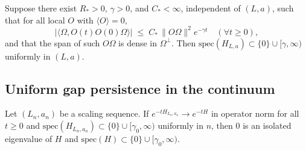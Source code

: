 \documentclass[11pt]{amsart}
\begin{document}
\begin{proposition}\label{prop:cluster-to-gap}
Suppose there exist $R_*>0$, $\gamma>0$, and $C_*<\infty$, independent of $(L,a)$, such that for all local $O$ with $\langle O\rangle=0$,
\[
  |\langle\Omega, O(t)O(0)\Omega\rangle|\;\le\; C_*\,\|O\Omega\|^2 e^{-\gamma t}\quad(\forall t\ge 0),
\]
and that the span of such $O\Omega$ is dense in $\Omega^\perp$. Then $\mathrm{spec}(H_{L,a})\subset\{0\}\cup[\gamma,\infty)$ uniformly in $(L,a)$.
\end{proposition}

\subsection*{Uniform gap persistence in the continuum}

\begin{theorem}\label{thm:gap-persist}
Let $(L_n,a_n)$ be a scaling sequence. If $e^{-tH_{L_n,a_n}}\to e^{-tH}$ in operator norm for all $t\ge 0$ and $\mathrm{spec}(H_{L_n,a_n})\subset\{0\}\cup[\gamma_0,\infty)$ uniformly in $n$, then $0$ is an isolated eigenvalue of $H$ and $\mathrm{spec}(H)\subset\{0\}\cup[\gamma_0,\infty)$.
\end{theorem}
\end{document}
